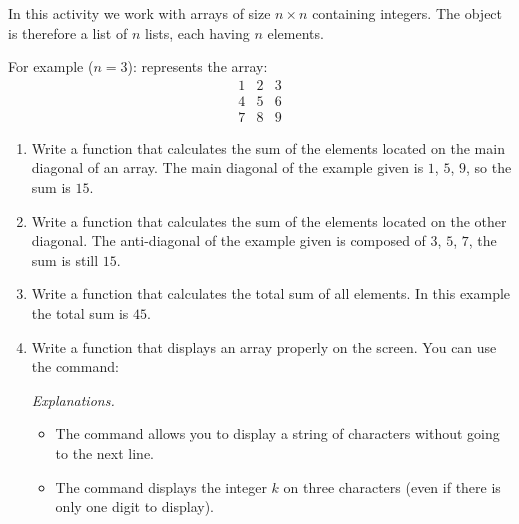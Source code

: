 \documentclass[11pt,class=report,crop=false]{standalone}
\begin{document}

\begin{activite}[Arrays]


In this activity we work with arrays of size $n \times n$ containing integers.
The object  is therefore a list of $n$ lists, each having $n$ elements.

For example ($n=3$): 
represents the array:
$$\begin{array}{ccc}1&2&3\\4&5&6\\7&8&9\end{array}$$

\begin{enumerate}
  \item Write a  function that calculates the sum of the elements located on the main diagonal of an array.
  The main diagonal of the example given is $1$, $5$, $9$, so the sum is $15$.
  
  \item Write a  function that calculates the sum of the elements located on the other diagonal.
  The anti-diagonal of the example given is composed of $3$, $5$, $7$, the sum is still $15$.
  
  \item Write a  function that calculates the total sum of all elements. In this example the total sum is $45$.
  
  \item Write a  function that displays an array properly on the screen. You can use the command:

\emph{Explanations.}
\begin{itemize}
  \item The command  allows you to display a string of characters without going to the next line.
  
  \item The command  displays the integer $k$ on three characters (even if there is only one digit to display).
\end{itemize}  
\end{enumerate}

\end{activite}
\end{document}
